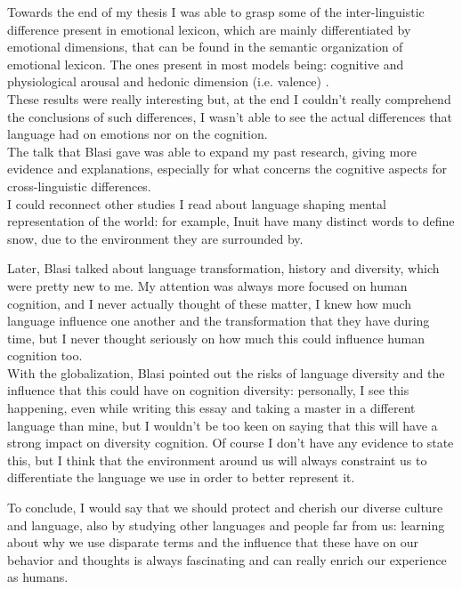 Towards the end of my thesis I was able to grasp some of the inter-linguistic difference present in emotional lexicon, which are mainly differentiated by emotional dimensions, that can be found in the semantic organization of emotional lexicon. The ones present in most models being: cognitive and physiological arousal and hedonic dimension (i.e. valence) \parencite{Russell_1980}. \\
These results were really interesting but, at the end I couldn't really comprehend the conclusions of such differences, I wasn't able to see the actual differences that language had on emotions nor on the cognition. \\
The talk that Blasi gave was able to expand my past research, giving more evidence  and explanations, especially for what concerns the cognitive aspects for cross-linguistic differences. \\
I could reconnect other studies I read about language shaping mental representation of the world: for example, Inuit have many distinct words to define snow, due to the environment they are surrounded by. 

Later, Blasi talked  about language transformation, history and diversity, which were pretty new to me. My attention was always more focused on human cognition, and I never actually thought of these matter, I knew how much language influence one another and the transformation that they have during time, but I never thought seriously on how much this could influence human cognition too. \\
With the globalization, Blasi pointed out the risks of language diversity and the influence that this could have on cognition diversity: personally, I see this happening, even while writing this essay and taking a master in a different language than mine, but I wouldn't be too keen on saying that this will have a strong impact on diversity cognition. Of course I don't have any evidence to state this, but I think that the environment around us will always constraint us to differentiate the language we use in order to better represent it. 

To conclude, I would say that we should protect and cherish our diverse culture and language, also by studying other languages and people far from us: learning about why we use disparate terms and the influence that these have on our behavior and thoughts is always fascinating and can really enrich our experience as humans. 